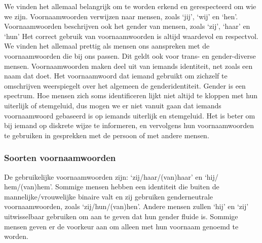 \documentclass[12pt,openany]{book}
\begin{document}
We vinden het allemaal belangrijk om te worden erkend en gerespecteerd om wie we zijn.
Voornaamwoorden verwijzen naar mensen, zoals ‘jij’, ‘wij’ en ‘hen’. Voornaamwoorden beschrijven ook het gender van mensen, zoals ‘zij’, ‘haar’ en ‘hun’ Het correct gebruik van voornaamwoorden is altijd waardevol en respectvol. We vinden het allemaal prettig als mensen ons aanspreken met de voornaamwoorden die bij ons passen. Dit geldt ook voor trans- en gender-diverse mensen. Voornaamwoorden maken deel uit van iemands identiteit, net zoals een naam dat doet. Het voornaamwoord dat iemand gebruikt om zichzelf te omschrijven weerspiegelt over het algemeen de genderidentiteit. Gender is een spectrum. Hoe mensen zich soms identificeren lijkt niet altijd te kloppen met hun uiterlijk of stemgeluid, dus mogen we er niet vanuit gaan dat iemands voornaamwoord gebaseerd is op iemands uiterlijk en stemgeluid. Het is beter om bij iemand op diskrete wijze te informeren, en vervolgens hun voornaamwoorden te gebruiken in gesprekken met de persoon of met andere mensen.

\bigskip

\noindent{}


\subsubsection*{Soorten voornaamwoorden}

De gebruikelijke voornaamwoorden zijn: ‘zij/haar/(van)haar’ en ‘hij/ hem/(van)hem’. Sommige mensen hebben een identiteit die buiten de mannelijke/vrouwelijke binaire valt en zij gebruiken genderneutrale voornaamwoorden, zoals ‘zij/hun/(van)hen’. Andere mensen zullen ‘hij’ en ‘zij’ uitwisselbaar gebruiken om aan te geven dat hun gender fluide is. Sommige mensen geven er de voorkeur aan om alleen met hun voornaam genoemd te worden.
\end{document}
